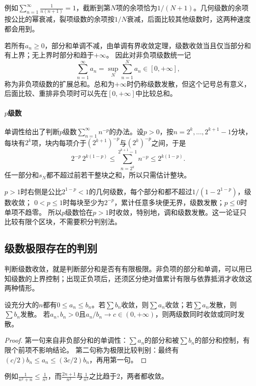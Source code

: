 例如$\sum_{n=1}^\infty\frac1{n(n+1)}=1$，截断到第$N$项的余项恰为$1/(N+1)$。几何级数的余项按公比的幂衰减，裂项级数的余项按$1/N$衰减，后面比较其他级数时，这两种速度都会用到。

若所有$a_n\geq0$，部分和单调不减，由单调有界收敛定理，级数收敛当且仅当部分和有上界；无上界时部分和趋于$+\infty$。
因此对非负项级数统一记
\[
 \sum_{n=1}^\infty a_n=\sup_N\sum_{n=1}^Na_n\in[0,+\infty],
\]
称为非负项级数的扩展总和。总和为$+\infty$时仍称级数发散，但这个记号总有意义，后面比较、重排非负项时可以先在$[0,+\infty]$中比较总和。

\paragraph{$p$级数}
单调性给出了判断$p$级数$\sum_{n=1}^\infty n^{-p}$的办法。设$p>0$，按$n=2^k,\ldots,2^{k+1}-1$分块，每块有$2^k$项，块内每项介于$(2^{k+1})^{-p}$与$(2^k)^{-p}$之间，于是
\[
 2^{-p}\,2^{k(1-p)}\leq\sum_{n=2^k}^{2^{k+1}-1}n^{-p}\leq2^{k(1-p)}.
\]
任一部分和$s_N$都不超过前若干整块之和，所以只需估计整块。

$p>1$时右侧是公比$2^{1-p}<1$的几何级数，每个部分和都不超过$1/(1-2^{1-p})$，级数收敛；
$0<p\leq1$时每块至少为$2^{-p}$，累计任意多块便无界，级数发散；$p\leq0$时单项不趋零。
所以$p$级数恰在$p>1$时收敛，特别地，调和级数发散。这一论证只比较有限个区块，不需要积分判别法。

\subsection{级数极限存在的判别}
\label{sec:ru-series-tests}
\label{sec:analysis-series-tests}

判断级数收敛，就是判断部分和是否有有限极限。非负项的部分和单调，可以用已知级数的上界控制；出现正负项后，还须区分绝对值累计有限与依靠抵消才收敛这两种情形。

\begin{theorem}[正项级数的比较判别]
\label{thm:ru-series-comparison}
设充分大的$n$都有$0\leq a_n\leq b_n$。若$\sum b_n$收敛，则$\sum a_n$收敛；若$\sum a_n$发散，则$\sum b_n$发散。
若$a_n,b_n>0$且$a_n/b_n\to c\in(0,+\infty)$，则两级数同时收敛或同时发散。
\end{theorem}
\begin{proof}
第一句来自非负部分和的单调性：$\sum a_n$的部分和被$\sum b_n$的部分和控制，有限个前项不影响结论。
第二句称为极限比较判别：最终有$(c/2)b_n\leq a_n\leq(3c/2)b_n$，再用第一句。
\end{proof}
例如$\frac{1}{n^2+n}\leq\frac1{n^2}$，而$\frac{2n+1}{n^3}$与$\frac1{n^2}$之比趋于$2$，两者都收敛。

